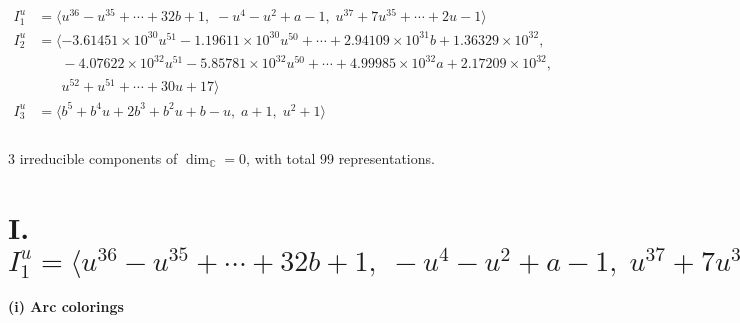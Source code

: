 \documentclass[1p]{elsarticle_modified}
\theoremstyle{definition}
\begin{document}
\begin{align*}
I^u_{1}&=\langle 
u^{36}- u^{35}+\cdots+32 b+1,\;- u^4- u^2+a-1,\;u^{37}+7 u^{35}+\cdots+2 u-1\rangle \\
I^u_{2}&=\langle 
-3.61451\times10^{30} u^{51}-1.19611\times10^{30} u^{50}+\cdots+2.94109\times10^{31} b+1.36329\times10^{32},\\
\phantom{I^u_{2}}&\phantom{= \langle  }-4.07622\times10^{32} u^{51}-5.85781\times10^{32} u^{50}+\cdots+4.99985\times10^{32} a+2.17209\times10^{32},\\
\phantom{I^u_{2}}&\phantom{= \langle  }u^{52}+u^{51}+\cdots+30 u+17\rangle \\
I^u_{3}&=\langle 
b^5+b^4 u+2 b^3+b^2 u+b- u,\;a+1,\;u^2+1\rangle \\
\\
\end{align*}
\raggedright * 3 irreducible components of $\dim_{\mathbb{C}}=0$, with total 99 representations.\\
\newpage
\renewcommand{\arraystretch}{1}
\centering \section*{I. $I^u_{1}= \langle u^{36}- u^{35}+\cdots+32 b+1,\;- u^4- u^2+a-1,\;u^{37}+7 u^{35}+\cdots+2 u-1 \rangle$}
\flushleft \textbf{(i) Arc colorings}\\
\end{document}
